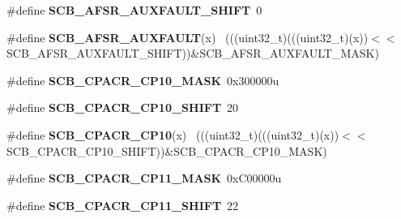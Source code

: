 \begin{DoxyCompactItemize}
\item 
\hypertarget{group___s_c_b___register___masks_ga6e27cdbb224a5d0a575fce61386ea774}{}\#define {\bfseries S\+C\+B\+\_\+\+A\+F\+S\+R\+\_\+\+A\+U\+X\+F\+A\+U\+L\+T\+\_\+\+S\+H\+I\+F\+T}~0\label{group___s_c_b___register___masks_ga6e27cdbb224a5d0a575fce61386ea774}

\item 
\hypertarget{group___s_c_b___register___masks_gaf77ae10495cf1061dfa77ceda3454679}{}\#define {\bfseries S\+C\+B\+\_\+\+A\+F\+S\+R\+\_\+\+A\+U\+X\+F\+A\+U\+L\+T}(x)                                      ~(((uint32\+\_\+t)(((uint32\+\_\+t)(x))$<$$<$S\+C\+B\+\_\+\+A\+F\+S\+R\+\_\+\+A\+U\+X\+F\+A\+U\+L\+T\+\_\+\+S\+H\+I\+F\+T))\&S\+C\+B\+\_\+\+A\+F\+S\+R\+\_\+\+A\+U\+X\+F\+A\+U\+L\+T\+\_\+\+M\+A\+S\+K)\label{group___s_c_b___register___masks_gaf77ae10495cf1061dfa77ceda3454679}

\item 
\hypertarget{group___s_c_b___register___masks_gafa39bbd18692ed5ca688a3588037be8b}{}\#define {\bfseries S\+C\+B\+\_\+\+C\+P\+A\+C\+R\+\_\+\+C\+P10\+\_\+\+M\+A\+S\+K}~0x300000u\label{group___s_c_b___register___masks_gafa39bbd18692ed5ca688a3588037be8b}

\item 
\hypertarget{group___s_c_b___register___masks_gad152ff22089e9339d66c14eaff382203}{}\#define {\bfseries S\+C\+B\+\_\+\+C\+P\+A\+C\+R\+\_\+\+C\+P10\+\_\+\+S\+H\+I\+F\+T}~20\label{group___s_c_b___register___masks_gad152ff22089e9339d66c14eaff382203}

\item 
\hypertarget{group___s_c_b___register___masks_gaed19bbab18e12077f4be8b95a9845145}{}\#define {\bfseries S\+C\+B\+\_\+\+C\+P\+A\+C\+R\+\_\+\+C\+P10}(x)                                            ~(((uint32\+\_\+t)(((uint32\+\_\+t)(x))$<$$<$S\+C\+B\+\_\+\+C\+P\+A\+C\+R\+\_\+\+C\+P10\+\_\+\+S\+H\+I\+F\+T))\&S\+C\+B\+\_\+\+C\+P\+A\+C\+R\+\_\+\+C\+P10\+\_\+\+M\+A\+S\+K)\label{group___s_c_b___register___masks_gaed19bbab18e12077f4be8b95a9845145}

\item 
\hypertarget{group___s_c_b___register___masks_gab3f89b64f29a83f3630105a26dabe21c}{}\#define {\bfseries S\+C\+B\+\_\+\+C\+P\+A\+C\+R\+\_\+\+C\+P11\+\_\+\+M\+A\+S\+K}~0x\+C00000u\label{group___s_c_b___register___masks_gab3f89b64f29a83f3630105a26dabe21c}

\item 
\hypertarget{group___s_c_b___register___masks_ga2a5c27b9d7fa6e36153276ef8b6bf346}{}\#define {\bfseries S\+C\+B\+\_\+\+C\+P\+A\+C\+R\+\_\+\+C\+P11\+\_\+\+S\+H\+I\+F\+T}~22\label{group___s_c_b___register___masks_ga2a5c27b9d7fa6e36153276ef8b6bf346}


\end{DoxyCompactItemize}
